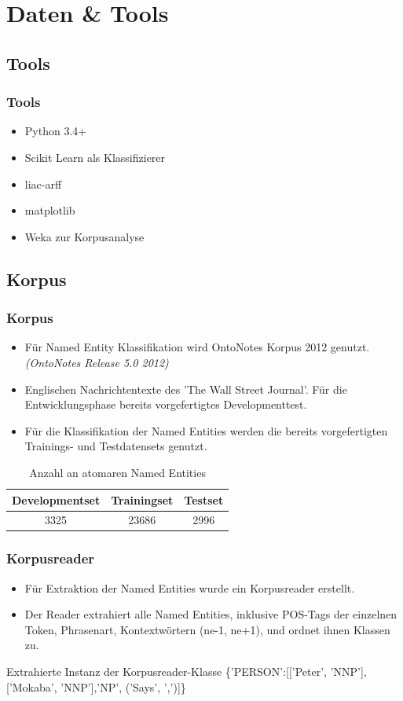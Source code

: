 \documentclass{beamer}
\begin{document}
\section{Daten \& Tools}
	\subsection{Tools}
	\begin{frame}
			\frametitle{Tools}
			\begin{itemize}
				\item Python 3.4+
				\item Scikit Learn als Klassifizierer
				\item liac-arff
				\item matplotlib
				\item Weka zur Korpusanalyse
			\end{itemize}
	\end{frame}
	\subsection{Korpus}
	\begin{frame}
			\frametitle{Korpus}
			\begin{itemize}
				\item Für Named Entity Klassifikation wird OntoNotes Korpus 2012 genutzt. \textit{(OntoNotes Release 5.0 2012)}
				\item Englischen Nachrichtentexte des 'The Wall Street Journal'.
				Für die Entwicklungsphase bereits vorgefertigtes Developmenttest.
				\item Für die Klassifikation der Named Entities werden die bereits vorgefertigten Trainings- und Testdatensets genutzt.
			\end{itemize}
			 \begin{table}
			 	\caption{Anzahl an atomaren Named Entities}
			 	\begin{tabular}{ccc}
			 		\toprule
					Developmentset & Trainingset & Testset\\
			 		\midrule
					3325 & 23686 & 2996\\
			 		\bottomrule
			 	\end{tabular}
			 	\label{tab:datasets}
			 \end{table}
	\end{frame}
		\begin{frame}
			\frametitle{Korpusreader}
			\begin{itemize}
				\item Für Extraktion der Named Entities wurde ein Korpusreader erstellt.
				\item 	Der Reader extrahiert alle Named Entities, inklusive POS-Tags der einzelnen Token, Phrasenart, Kontextwörtern (ne-1, ne+1), und ordnet ihnen Klassen zu.
			\end{itemize}
			
			
		
			
			\begin{exampleblock}{Extrahierte Instanz der Korpusreader-Klasse}
				\{'PERSON':[['Peter', 'NNP'],['Mokaba', 'NNP'],'NP', ('Says', ',')]\}
			\end{exampleblock}
			
		\end{frame}
	
\end{document}
